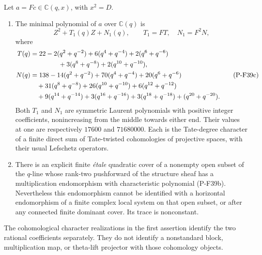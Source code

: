 \begin{proposition}
\label{prop:nonstandardtracenorm}
Let $a=Fc\in\mathbb C(q,x)$, with $x^2=D$.
\begin{enumerate}
\item The minimal polynomial of $a$ over $\mathbb C(q)$ is
\[
                   Z^2+T_1(q)Z+N_1(q),
 \qquad T_1=FT,\quad N_1=F^2N,
 \tag{P-F39b}
\]
where
\[
 \begin{split}
 T(q)&=22-2(q^2+q^{-2})+6(q^4+q^{-4})
       +2(q^6+q^{-6})\\
     &\hspace{15mm}+3(q^8+q^{-8})+2(q^{10}+q^{-10}),\\
 N(q)&=138-14(q^2+q^{-2})+70(q^4+q^{-4})
      +20(q^6+q^{-6})\\
     &\quad+31(q^8+q^{-8})+26(q^{10}+q^{-10})
      +6(q^{12}+q^{-12})\\
     &\quad+9(q^{14}+q^{-14})+3(q^{16}+q^{-16})
      +3(q^{18}+q^{-18})+(q^{20}+q^{-20}).
 \end{split}
 \tag{P-F39c}
\]
Both $T_1$ and $N_1$ are symmetric Laurent polynomials with positive
integer coefficients, nonincreasing from the middle towards either
end. Their values at one are respectively $17600$ and $71680000$.
Each is the Tate-degree character of a finite direct sum of
Tate-twisted cohomologies of projective spaces, with their usual
Lefschetz operators.
\item There is an explicit finite \emph{\'{e}tale} quadratic cover
of a nonempty open subset of the $q$-line whose rank-two pushforward
of the structure sheaf has a multiplication endomorphism with
characteristic polynomial (P-F39b). Nevertheless this endomorphism
cannot be identified with a horizontal endomorphism of a finite
complex local system on that open subset, or after any connected
finite dominant cover. Its trace is nonconstant.
\end{enumerate}
The cohomological character realizations in the first assertion
identify the two rational coefficients separately. They do not
identify a nonstandard block, multiplication map, or theta-lift
projector with those cohomology objects.
\end{proposition}

